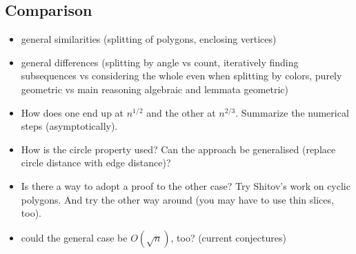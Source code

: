 \subsection{Comparison}

\begin{itemize}
  \item general similarities (splitting of polygons, enclosing vertices)
  \item general differences (splitting by angle vs count, iteratively finding subsequences vs considering the whole even when splitting by colors, purely geometric vs main reasoning algebraic and lemmata geometric)
  \item How does one end up at $n^{1/2}$ and the other at $n^{2/3}$. Summarize the numerical steps (asymptotically).
  \item How is the circle property used? Can the approach be generalised (replace circle distance with edge distance)?
  \item Is there a way to adopt a proof to the other case? Try Shitov's work on cyclic polygons. And try the other way around (you may have to use thin slices, too).
  \item could the general case be $O(\sqrt{n})$, too? (current conjectures)
\end{itemize}
